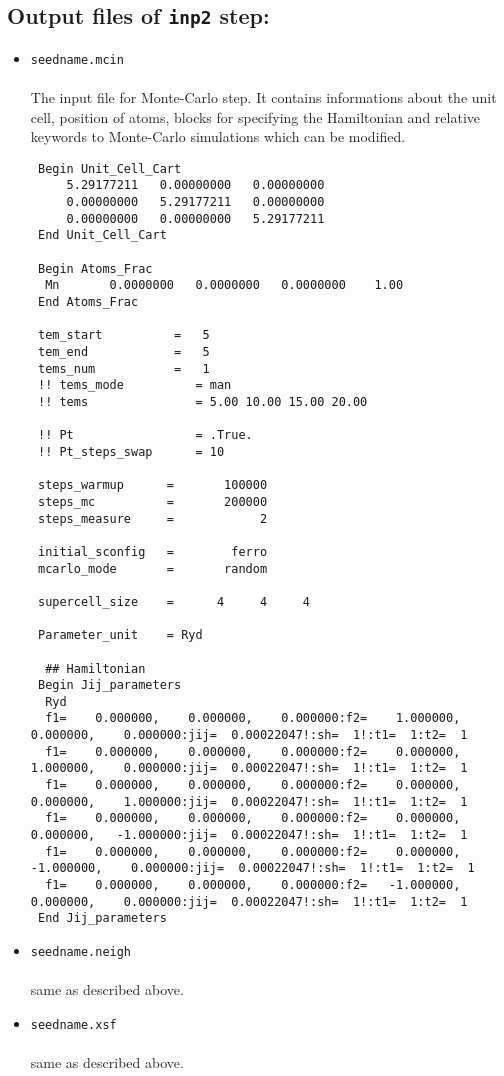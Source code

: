 \documentclass[10pt]{report}
\begin{document}
\subsection{Output files of {\tt inp2} step:}
\begin{itemize}
\item {\tt seedname.mcin}\\\\
The input file for Monte-Carlo step. It contains informations about the unit cell, position of atoms, 
 blocks for specifying the Hamiltonian and 
relative keywords to Monte-Carlo simulations which can be modified.
{\scriptsize    
\begin{verbatim}
 Begin Unit_Cell_Cart
     5.29177211   0.00000000   0.00000000
     0.00000000   5.29177211   0.00000000
     0.00000000   0.00000000   5.29177211
 End Unit_Cell_Cart

 Begin Atoms_Frac
  Mn       0.0000000   0.0000000   0.0000000    1.00
 End Atoms_Frac

 tem_start          =   5
 tem_end            =   5
 tems_num           =   1
 !! tems_mode          = man
 !! tems               = 5.00 10.00 15.00 20.00

 !! Pt                 = .True.
 !! Pt_steps_swap      = 10

 steps_warmup      =       100000
 steps_mc          =       200000
 steps_measure     =            2

 initial_sconfig   =        ferro
 mcarlo_mode       =       random

 supercell_size    =      4     4     4

 Parameter_unit    = Ryd

  ## Hamiltonian
 Begin Jij_parameters
  Ryd
  f1=    0.000000,    0.000000,    0.000000:f2=    1.000000,    0.000000,    0.000000:jij=  0.00022047!:sh=  1!:t1=  1:t2=  1
  f1=    0.000000,    0.000000,    0.000000:f2=    0.000000,    1.000000,    0.000000:jij=  0.00022047!:sh=  1!:t1=  1:t2=  1
  f1=    0.000000,    0.000000,    0.000000:f2=    0.000000,    0.000000,    1.000000:jij=  0.00022047!:sh=  1!:t1=  1:t2=  1
  f1=    0.000000,    0.000000,    0.000000:f2=    0.000000,    0.000000,   -1.000000:jij=  0.00022047!:sh=  1!:t1=  1:t2=  1
  f1=    0.000000,    0.000000,    0.000000:f2=    0.000000,   -1.000000,    0.000000:jij=  0.00022047!:sh=  1!:t1=  1:t2=  1
  f1=    0.000000,    0.000000,    0.000000:f2=   -1.000000,    0.000000,    0.000000:jij=  0.00022047!:sh=  1!:t1=  1:t2=  1
 End Jij_parameters
\end{verbatim}
}
\item {\tt seedname.neigh}\\\\
same as described above.
\item {\tt seedname.xsf}\\\\
same as described above.
\end{itemize}
\end{document}

